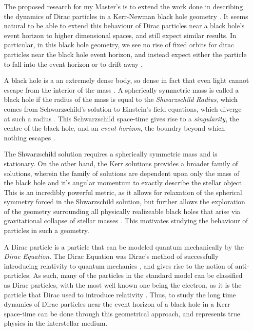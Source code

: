 \documentclass[12pt]{article}
\begin{document}
The proposed research for my Master's is to extend the work done in describing the dynamics of Dirac particles in a Kerr-Newman black hole geometry \cite{atmp}. It seems natural to be able to extend this behaviour of Dirac particles near a black hole's event horizon to higher dimensional spaces, and still expect similar results. In particular, in this black hole geometry, we see no rise of fixed orbits for dirac particles near the black hole event horizon, and instead expect either the particle to fall into the event horizon or to drift away \cite{cpam}.

A black hole is a an extremely dense body, so dense in fact that even light cannot escape from the interior of the mass \cite{gr}. A spherically symmetric mass is called a black hole if the radius of the mass is equal to the \textit{Shwarzschild Radius}, which comes from Schwarzschild's solution to Einstein's field equations, which diverge at such a radius \cite{gr}. This Schwarzschild space-time gives rise to a \textit{singularity}, the centre of the black hole, and an \textit{event horizon}, the boundry beyond which nothing escapes \cite{mbh}.

The Shwarzschild solution requires a spherically symmetric mass and is stationary. On the other hand, the Kerr solutions provides a broader family of solutions, wherein the family of solutions are dependent upon only the mass of the black hole and it's angular momentum to exactly describe the stellar object \cite{mbh}. This is an incredibly powerful metric, as it allows for relaxation of the spherical symmetry forced in the Shwarzschild solution, but further allows the exploration of the geometry surrounding all physically realizeable black holes that arise via gravitational collapse of stellar masses \cite{mbh}. This motivates studying the behaviour of particles in such a geometry.

A Dirac particle is a particle that can be modeled quantum mechanically by the \textit{Dirac Equation}. The Dirac Equation was Dirac's method of successfully introducing relativity to quantum mechanics \cite{dirac}, and gives rise to the notion of anti-particles. As such, many of the particles in the standard model can be classified as Dirac particles, with the most well known one being the electron, as it is the particle that Dirac used to introduce relativity \cite{dirac}. Thus, to study the long time dynamics of Dirac particles near the event horizon of a black hole in a Kerr space-time can be done through this geometrical approach, and represents true physics in the interstellar medium.
\end{document}
